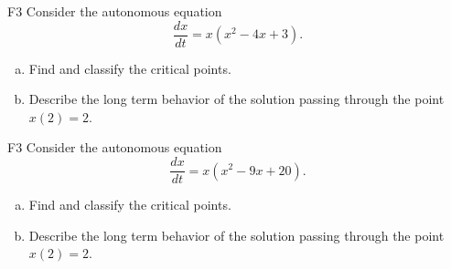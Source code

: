 \begin{problem}{F3}
Consider the autonomous equation
\[
\frac{dx}{dt} = x(x^2 - 4x + 3).
\]
\begin{enumerate}[(a)]
\item Find and classify the critical points.
\item Describe the long term behavior of the solution passing through the point \(x(2)=2\).
\end{enumerate}
\end{problem}

\begin{problem}{F3}
Consider the autonomous equation
\[
\frac{dx}{dt} = x(x^2 - 9x + 20).
\]
\begin{enumerate}[(a)]
\item Find and classify the critical points.
\item Describe the long term behavior of the solution passing through the point \(x(2)=2\).
\end{enumerate}
\end{problem}

